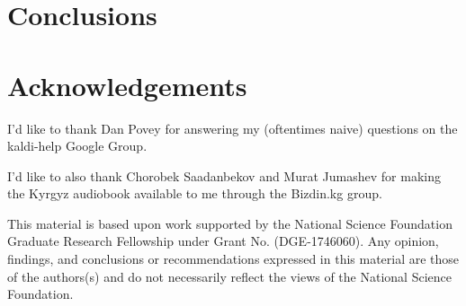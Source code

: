 \documentclass[a4paper]{article}
\begin{document}
\section{Conclusions}






\section{Acknowledgements}

I'd like to thank Dan Povey for answering my (oftentimes naive) questions on the kaldi-help Google Group.

I'd like to also thank Chorobek Saadanbekov and Murat Jumashev for making the Kyrgyz audiobook available to me through the Bizdin.kg group.

This material is based upon work supported by the National Science Foundation Graduate Research Fellowship under Grant No. (DGE-1746060). Any opinion, findings, and conclusions or recommendations expressed in this material are those of the authors(s) and do not necessarily reflect the views of the National Science Foundation.





\newpage



\end{document}

